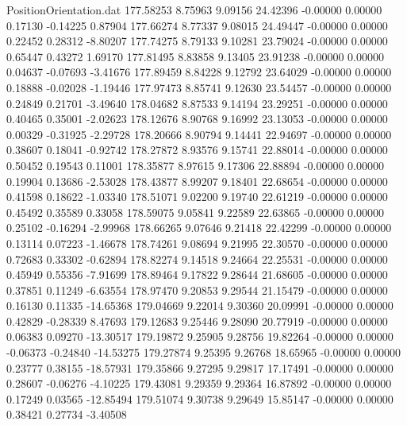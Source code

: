\begin{filecontents}{PositionOrientation.dat}
 177.58253    8.75963    9.09156    24.42396   -0.00000    0.00000    0.17130   -0.14225    0.87904
 177.66274    8.77337    9.08015    24.49447   -0.00000    0.00000    0.22452    0.28312   -8.80207
 177.74275    8.79133    9.10281    23.79024   -0.00000    0.00000    0.65447    0.43272    1.69170
 177.81495    8.83858    9.13405    23.91238   -0.00000    0.00000    0.04637   -0.07693   -3.41676
 177.89459    8.84228    9.12792    23.64029   -0.00000    0.00000    0.18888   -0.02028   -1.19446
 177.97473    8.85741    9.12630    23.54457   -0.00000    0.00000    0.24849    0.21701   -3.49640
 178.04682    8.87533    9.14194    23.29251   -0.00000    0.00000    0.40465    0.35001   -2.02623
 178.12676    8.90768    9.16992    23.13053   -0.00000    0.00000    0.00329   -0.31925   -2.29728
 178.20666    8.90794    9.14441    22.94697   -0.00000    0.00000    0.38607    0.18041   -0.92742
 178.27872    8.93576    9.15741    22.88014   -0.00000    0.00000    0.50452    0.19543    0.11001
 178.35877    8.97615    9.17306    22.88894   -0.00000    0.00000    0.19904    0.13686   -2.53028
 178.43877    8.99207    9.18401    22.68654   -0.00000    0.00000    0.41598    0.18622   -1.03340
 178.51071    9.02200    9.19740    22.61219   -0.00000    0.00000    0.45492    0.35589    0.33058
 178.59075    9.05841    9.22589    22.63865   -0.00000    0.00000    0.25102   -0.16294   -2.99968
 178.66265    9.07646    9.21418    22.42299   -0.00000    0.00000    0.13114    0.07223   -1.46678
 178.74261    9.08694    9.21995    22.30570   -0.00000    0.00000    0.72683    0.33302   -0.62894
 178.82274    9.14518    9.24664    22.25531   -0.00000    0.00000    0.45949    0.55356   -7.91699
 178.89464    9.17822    9.28644    21.68605   -0.00000    0.00000    0.37851    0.11249   -6.63554
 178.97470    9.20853    9.29544    21.15479   -0.00000    0.00000    0.16130    0.11335  -14.65368
 179.04669    9.22014    9.30360    20.09991   -0.00000    0.00000    0.42829   -0.28339    8.47693
 179.12683    9.25446    9.28090    20.77919   -0.00000    0.00000    0.06383    0.09270  -13.30517
 179.19872    9.25905    9.28756    19.82264   -0.00000    0.00000   -0.06373   -0.24840  -14.53275
 179.27874    9.25395    9.26768    18.65965   -0.00000    0.00000    0.23777    0.38155  -18.57931
 179.35866    9.27295    9.29817    17.17491   -0.00000    0.00000    0.28607   -0.06276   -4.10225
 179.43081    9.29359    9.29364    16.87892   -0.00000    0.00000    0.17249    0.03565  -12.85494
 179.51074    9.30738    9.29649    15.85147   -0.00000    0.00000    0.38421    0.27734   -3.40508

\end{filecontents}
